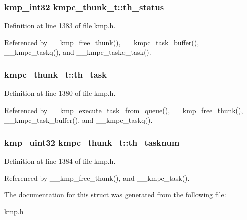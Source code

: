 \hypertarget{structkmpc__thunk__t_a6e987faf085a9ed1272495eea346c483}{
\subsubsection[{th\-\_\-status}]{\setlength{\rightskip}{0pt plus 5cm}kmp\-\_\-int32 kmpc\-\_\-thunk\-\_\-t\-::th\-\_\-status}}\label{structkmpc__thunk__t_a6e987faf085a9ed1272495eea346c483}


Definition at line 1383 of file kmp.\-h.



Referenced by \-\_\-\-\_\-kmp\-\_\-free\-\_\-thunk(), \-\_\-\-\_\-kmpc\-\_\-task\-\_\-buffer(), \-\_\-\-\_\-kmpc\-\_\-taskq(), and \-\_\-\-\_\-kmpc\-\_\-taskq\-\_\-task().

\hypertarget{structkmpc__thunk__t_a3bf681925c3209e5fa5d9a6059d4f8e1}{
\subsubsection[{th\-\_\-task}]{ kmpc\-\_\-thunk\-\_\-t\-::th\-\_\-task}}\label{structkmpc__thunk__t_a3bf681925c3209e5fa5d9a6059d4f8e1}


Definition at line 1380 of file kmp.\-h.



Referenced by \-\_\-\-\_\-kmp\-\_\-execute\-\_\-task\-\_\-from\-\_\-queue(), \-\_\-\-\_\-kmp\-\_\-free\-\_\-thunk(), \-\_\-\-\_\-kmpc\-\_\-task\-\_\-buffer(), and \-\_\-\-\_\-kmpc\-\_\-taskq().

\hypertarget{structkmpc__thunk__t_ae634cea43cfdc789c6cd8c3fafa394ea}{
\subsubsection[{th\-\_\-tasknum}]{\setlength{\rightskip}{0pt plus 5cm}kmp\-\_\-uint32 kmpc\-\_\-thunk\-\_\-t\-::th\-\_\-tasknum}}\label{structkmpc__thunk__t_ae634cea43cfdc789c6cd8c3fafa394ea}


Definition at line 1384 of file kmp.\-h.



Referenced by \-\_\-\-\_\-kmp\-\_\-free\-\_\-thunk(), and \-\_\-\-\_\-kmpc\-\_\-task().



The documentation for this struct was generated from the following file\-:\begin{DoxyCompactItemize}
\item 
\hyperlink{kmp_8h}{kmp.\-h}\end{DoxyCompactItemize}
